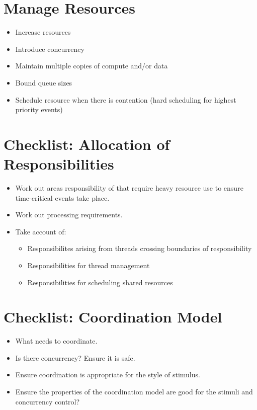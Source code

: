 \documentclass{report}
\begin{document}
\section{Manage Resources}

\begin{itemize}
\item{Increase resources}
\item{Introduce concurrency}
\item{Maintain multiple copies of compute and/or data}
\item{Bound queue sizes}
\item{Schedule resource when there is contention (hard scheduling for highest priority events)}
\end{itemize}

\section{Checklist: Allocation of Responsibilities}
\begin{itemize}
\item{Work out areas responsibility of that require heavy resource use to ensure time-critical events take place.}
\item{Work out processing requirements.}
\item{Take account of:
	\begin{itemize}
	\item{Responsibilites arising from threads crossing boundaries of responsibility}
	\item{Responsibilities for thread management}
	\item{Responsibilities for scheduling shared resources}
	\end{itemize}
}
\end{itemize}

\section{Checklist: Coordination Model }
\begin{itemize}
\item{What needs to coordinate.}
\item{Is there concurrency?  Ensure it is safe.}
\item{Ensure coordination is appropriate for the style of stimulus.}
\item{Ensure the properties of the coordination model are good for the stimuli and concurrency control?}
\end{itemize}
\end{document}
